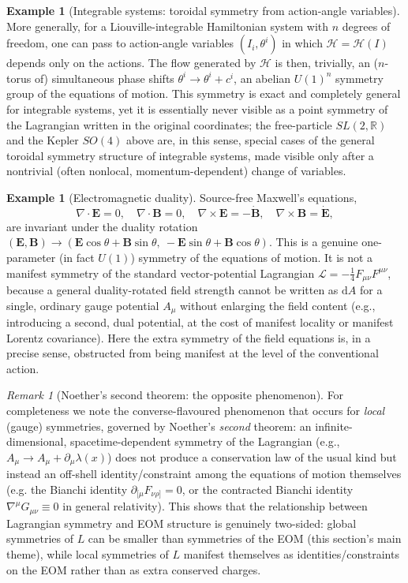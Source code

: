 \documentclass[11pt]{article}
\theoremstyle{definition}
\newtheorem{example}[theorem]{Example}
\theoremstyle{remark}
\newtheorem{remark}[theorem]{Remark}
\newcommand{\dd}{\mathrm{d}}
\newcommand{\Lag}{\mathcal{L}}
\newcommand{\Ham}{\mathcal{H}}
\newcommand{\Real}{\mathbb{R}}
\begin{document}
\begin{example}[Integrable systems: toroidal symmetry from action-angle variables]
More generally, for a Liouville-integrable Hamiltonian system with $n$ degrees of freedom, one can pass to action-angle variables $(I_i,\theta^i)$ in which $\Ham = \Ham(I)$ depends only on the actions. The flow generated by $\Ham$ is then, trivially, an ($n$-torus of) simultaneous phase shifts $\theta^i \to \theta^i+c^i$, an abelian $U(1)^n$ symmetry group of the equations of motion. This symmetry is exact and completely general for integrable systems, yet it is essentially never visible as a point symmetry of the Lagrangian written in the original coordinates; the free-particle $SL(2,\Real)$ and the Kepler $SO(4)$ above are, in this sense, special cases of the general toroidal symmetry structure of integrable systems, made visible only after a nontrivial (often nonlocal, momentum-dependent) change of variables.
\end{example}

\begin{example}[Electromagnetic duality]
Source-free Maxwell's equations,
\[
\nabla\!\cdot\!\bm E=0,\quad \nabla\!\cdot\!\bm B=0,\quad \nabla\times \bm E=-\dot{\bm B},\quad \nabla\times\bm B=\dot{\bm E},
\]
are invariant under the duality rotation $(\bm E,\bm B)\to(\bm E\cos\theta+\bm B\sin\theta,\ -\bm E\sin\theta+\bm B\cos\theta)$. This is a genuine one-parameter (in fact $U(1)$) symmetry of the equations of motion. It is not a manifest symmetry of the standard vector-potential Lagrangian $\Lag=-\tfrac14 F_{\mu\nu}F^{\mu\nu}$, because a general duality-rotated field strength cannot be written as $\dd A$ for a single, ordinary gauge potential $A_\mu$ without enlarging the field content (e.g., introducing a second, dual potential, at the cost of manifest locality or manifest Lorentz covariance). Here the extra symmetry of the field equations is, in a precise sense, obstructed from being manifest at the level of the conventional action.
\end{example}

\begin{remark}[Noether's second theorem: the opposite phenomenon]
For completeness we note the converse-flavoured phenomenon that occurs for \emph{local} (gauge) symmetries, governed by Noether's \emph{second} theorem: an infinite-dimensional, spacetime-dependent symmetry of the Lagrangian (e.g., $A_\mu\to A_\mu+\partial_\mu\lambda(x)$) does not produce a conservation law of the usual kind but instead an off-shell identity/constraint among the equations of motion themselves (e.g. the Bianchi identity $\partial_{[\mu}F_{\nu\rho]}=0$, or the contracted Bianchi identity $\nabla^\mu G_{\mu\nu}\equiv0$ in general relativity). This shows that the relationship between Lagrangian symmetry and EOM structure is genuinely two-sided: global symmetries of $L$ can be smaller than symmetries of the EOM (this section's main theme), while local symmetries of $L$ manifest themselves as identities/constraints on the EOM rather than as extra conserved charges.
\end{remark}
\end{document}
